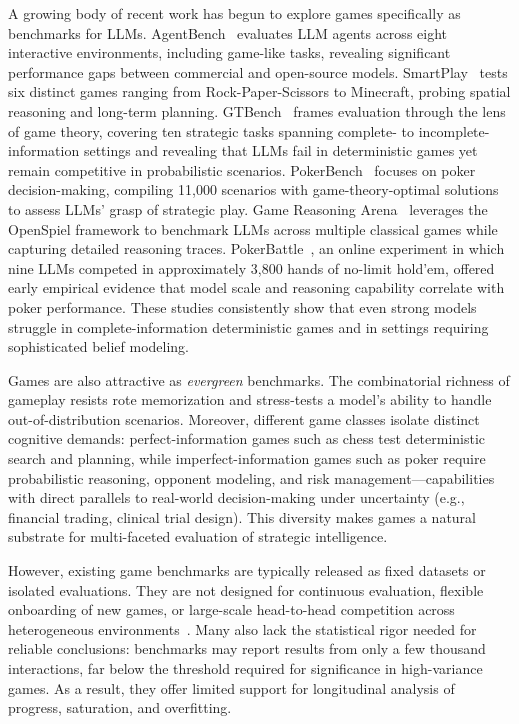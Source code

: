 \documentclass{article}
\begin{document}
A growing body of recent work has begun to explore games specifically as benchmarks for LLMs. AgentBench~\citep{liu2023agentbench} evaluates LLM agents across eight interactive environments, including game-like tasks, revealing significant performance gaps between commercial and open-source models. SmartPlay~\citep{wu2024smartplay} tests six distinct games ranging from Rock-Paper-Scissors to Minecraft, probing spatial reasoning and long-term planning. GTBench~\citep{duan2024gtbench} frames evaluation through the lens of game theory, covering ten strategic tasks spanning complete- to incomplete-information settings and revealing that LLMs fail in deterministic games yet remain competitive in probabilistic scenarios. PokerBench~\citep{zhuang2025pokerbench} focuses on poker decision-making, compiling 11,000 scenarios with game-theory-optimal solutions to assess LLMs' grasp of strategic play. Game Reasoning Arena~\citep{cipolinakun2025gamereasoningarena} leverages the OpenSpiel framework to benchmark LLMs across multiple classical games while capturing detailed reasoning traces. PokerBattle~\citep{pavlov2025pokerbattle}, an online experiment in which nine LLMs competed in approximately 3,800 hands of no-limit hold'em, offered early empirical evidence that model scale and reasoning capability correlate with poker performance. These studies consistently show that even strong models struggle in complete-information deterministic games and in settings requiring sophisticated belief modeling.

Games are also attractive as \emph{evergreen} benchmarks. The combinatorial richness of gameplay resists rote memorization and stress-tests a model's ability to handle out-of-distribution scenarios. Moreover, different game classes isolate distinct cognitive demands: perfect-information games such as chess test deterministic search and planning, while imperfect-information games such as poker require probabilistic reasoning, opponent modeling, and risk management---capabilities with direct parallels to real-world decision-making under uncertainty (e.g., financial trading, clinical trial design). This diversity makes games a natural substrate for multi-faceted evaluation of strategic intelligence.

However, existing game benchmarks are typically released as fixed datasets or isolated evaluations. They are not designed for continuous evaluation, flexible onboarding of new games, or large-scale head-to-head competition across heterogeneous environments~\citep{cipolinakun2025gamereasoningarena}. Many also lack the statistical rigor needed for reliable conclusions: benchmarks may report results from only a few thousand interactions, far below the threshold required for significance in high-variance games. As a result, they offer limited support for longitudinal analysis of progress, saturation, and overfitting.
\end{document}
